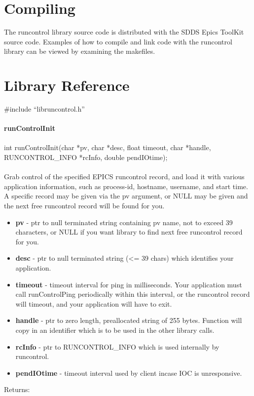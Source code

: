 \documentclass[11pt]{article}
\begin{document}
\section{Compiling}

The runcontrol library source code is distributed with the SDDS Epics ToolKit source code. Examples of how to compile and link code with the runcontrol library can be viewed by examining the makefiles.

\section{Library Reference}

\#include ``libruncontrol.h''\\
\\
{\bf runControlInit}\\
\\
int runControlInit(char *pv, char *desc, float timeout, char *handle, RUNCONTROL\_INFO *rcInfo, double pendIOtime);\\
\\
Grab control of the specified EPICS runcontrol record, and load it with various application information, such as process-id, hostname, username, and start time. A specific record may be given via the pv argument, or NULL may be given and the next free runcontrol record will be found for you.

\begin{itemize}
\item {\bf pv} - ptr to null terminated string containing pv name, not to exceed 39 characters, or NULL if you want library to find next free runcontrol record for you.
\item {\bf desc} - ptr to null terminated string (<= 39 chars) which identifies your application.
\item {\bf timeout} - timeout interval for ping in milliseconds. Your application must call runControlPing periodically within this interval, or the runcontrol record will timeout, and your application will have to exit.
\item {\bf handle} - ptr to zero length, preallocated string of 255 bytes. Function will copy in an identifier which is to be used in the other library calls.
\item {\bf rcInfo} - ptr to RUNCONTROL\_INFO which is used internally by runcontrol.
\item {\bf pendIOtime} - timeout interval used by client incase IOC is unresponsive.
\end{itemize}
Returns:
\end{document}
